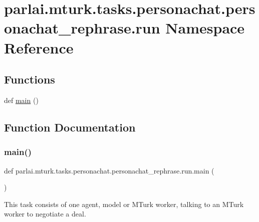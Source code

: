 \hypertarget{namespaceparlai_1_1mturk_1_1tasks_1_1personachat_1_1personachat__rephrase_1_1run}{}\section{parlai.\+mturk.\+tasks.\+personachat.\+personachat\+\_\+rephrase.\+run Namespace Reference}
\label{namespaceparlai_1_1mturk_1_1tasks_1_1personachat_1_1personachat__rephrase_1_1run}
\subsection*{Functions}
\begin{DoxyCompactItemize}
\item 
def \hyperlink{namespaceparlai_1_1mturk_1_1tasks_1_1personachat_1_1personachat__rephrase_1_1run_a91f09d955cf9e1502d8d9882fa7e1f69}{main} ()
\end{DoxyCompactItemize}


\subsection{Function Documentation}
\mbox{\label{namespaceparlai_1_1mturk_1_1tasks_1_1personachat_1_1personachat__rephrase_1_1run_a91f09d955cf9e1502d8d9882fa7e1f69}} 
\subsubsection{\texorpdfstring{main()}{main()}}
{\footnotesize\ttfamily def parlai.\+mturk.\+tasks.\+personachat.\+personachat\+\_\+rephrase.\+run.\+main (\begin{DoxyParamCaption}{ }\end{DoxyParamCaption})}

\begin{DoxyVerb}This task consists of one agent, model or MTurk worker, talking to an MTurk worker
to negotiate a deal.
\end{DoxyVerb}
 

